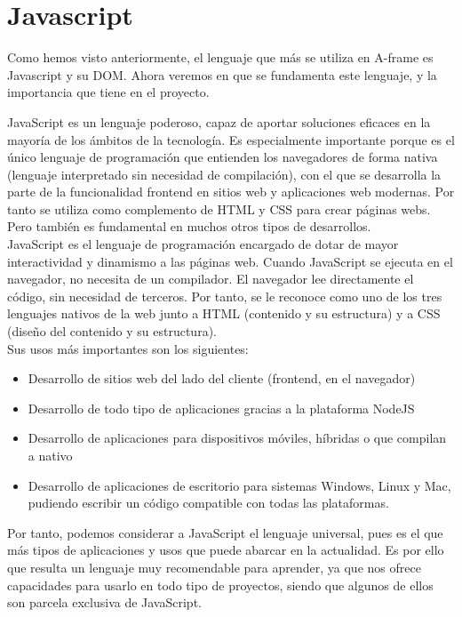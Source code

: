 \documentclass[a4paper, 12pt]{book}
\begin{document}
\section{Javascript} 
\label{sec:javascript}

Como hemos visto anteriormente, el lenguaje que más se utiliza en A-frame es Javascript y su DOM.
Ahora veremos en que se fundamenta este lenguaje, y la importancia que tiene en el proyecto.


JavaScript es un lenguaje poderoso, capaz de aportar soluciones eficaces en la mayoría de los ámbitos de la tecnología.
Es especialmente importante porque es el único lenguaje de programación que entienden los navegadores de forma nativa (lenguaje interpretado sin necesidad de compilación), con el que se desarrolla la parte de la funcionalidad frontend en sitios web y aplicaciones web modernas. Por tanto se utiliza como complemento de HTML y CSS para crear páginas webs. Pero también es fundamental en muchos otros tipos de desarrollos.\\
JavaScript es el lenguaje de programación encargado de dotar de mayor interactividad y dinamismo a las páginas web. Cuando JavaScript se ejecuta en el navegador, no necesita de un compilador. El navegador lee directamente el código, sin necesidad de terceros. Por tanto, se le reconoce como uno de los tres lenguajes nativos de la web junto a HTML (contenido y su estructura) y a CSS (diseño del contenido y su estructura).\\

Sus usos más importantes son los siguientes:
\begin{itemize}
    
    \item  Desarrollo de sitios web del lado del cliente (frontend, en el navegador)
    \item  Desarrollo de todo tipo de aplicaciones gracias a la plataforma NodeJS
    \item  Desarrollo de aplicaciones para dispositivos móviles, híbridas o que compilan a nativo
    \item  Desarrollo de aplicaciones de escritorio para sistemas Windows, Linux y Mac, pudiendo escribir un código compatible con todas las plataformas.


    
\end{itemize}
Por tanto, podemos considerar a JavaScript el lenguaje universal, pues es el que más tipos de aplicaciones y usos que puede abarcar en la actualidad. Es por ello que resulta un lenguaje muy recomendable para aprender, ya que nos ofrece capacidades para usarlo en todo tipo de proyectos, siendo que algunos de ellos son parcela exclusiva de JavaScript.
\end{document}
